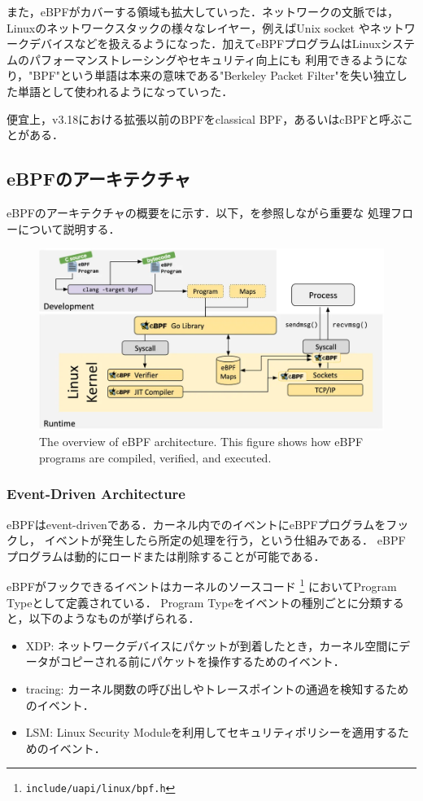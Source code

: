 また，eBPFがカバーする領域も拡大していった．ネットワークの文脈では，Linuxのネットワークスタックの様々なレイヤー，例えばUnix socket
やネットワークデバイスなどを扱えるようになった．加えてeBPFプログラムはLinuxシステムのパフォーマンストレーシングやセキュリティ向上にも
利用できるようになり，"BPF"という単語は本来の意味である"Berkeley Packet Filter"を失い独立した単語として使われるようになっていった．

便宜上，v3.18における拡張以前のBPFをclassical BPF，あるいはcBPFと呼ぶことがある．

\subsection{eBPFのアーキテクチャ}
eBPFのアーキテクチャの概要をに示す．以下，を参照しながら重要な
処理フローについて説明する．
\begin{figure}[tp]
  \begin{center}
    \includegraphics[width=\columnwidth]{./img/ebpf_system.png}
  \end{center}
  \caption{The overview of eBPF architecture. This figure shows how eBPF programs are compiled, verified, and executed.
    \cite{WhatiseB29:online}}
  \label{img:ebpf-system}
\end{figure}

\subsubsection{Event-Driven Architecture}
eBPFはevent-drivenである．カーネル内でのイベントにeBPFプログラムをフックし，
イベントが発生したら所定の処理を行う，という仕組みである．
eBPFプログラムは動的にロードまたは削除することが可能である．

eBPFがフックできるイベントはカーネルのソースコード \footnote{\texttt{include/uapi/linux/bpf.h}} においてProgram Typeとして定義されている．
Program Typeをイベントの種別ごとに分類すると，以下のようなものが挙げられる．
\begin{itemize}
  \item XDP: ネットワークデバイスにパケットが到着したとき，カーネル空間にデータがコピーされる前にパケットを操作するためのイベント．
  \item tracing: カーネル関数の呼び出しやトレースポイントの通過を検知するためのイベント．
  \item LSM: Linux Security Moduleを利用してセキュリティポリシーを適用するためのイベント．
\end{itemize}

